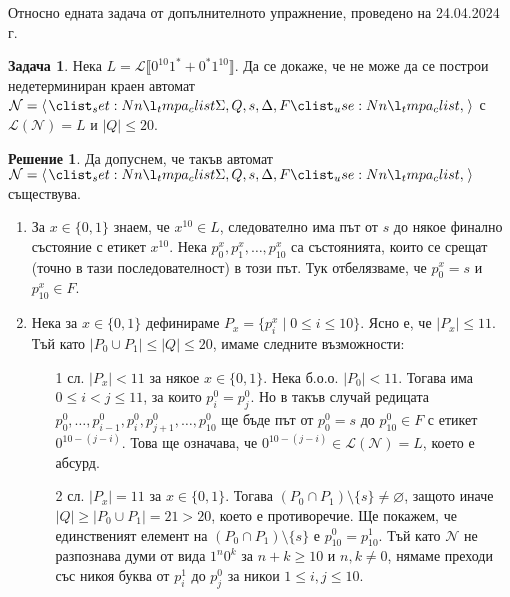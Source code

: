 \documentclass{article}
\newcommand{\N}{\mathcal{N}}
\newcommand{\calL}{\mathcal{L}}
\theoremstyle{definition}
\newtheorem*{problem}{Задача}
\newtheorem*{solution}{Решение}
\begin{document}
\begin{center}
    \Large{Относно едната задача от допълнителното упражнение, проведено на 24.04.2024 г.}
\end{center}

\vspace*{4mm}

\begin{problem}
Нека $L = \calL \llbracket 0^{10} 1^* + 0^* 1^{10} \rrbracket$.
Да се докаже, че не може да се построи недетерминиран краен автомат $\N = \opair{\Sigma, Q, s, \Delta, F}$ с $\calL(\N) = L$ и $|Q| \leq 20$.
\end{problem}

\begin{solution}
    Да допуснем, че такъв автомат $\N = \opair{\Sigma, Q, s, \Delta, F}$ съществува.
    \begin{enumerate}
        \item За $x \in \{ 0, 1 \}$ знаем, че $x^{10} \in L$, следователно има път от $s$ до някое финално състояние с етикет $x^{10}$.
              Нека $p^x_0, p^x_1, \dots, p^{x}_{10}$ са състоянията, които се срещат (точно в тази последователност) в този път.
              Тук отбелязваме, че $p^x_0 = s$ и $p^x_{10} \in F$.
        \item Нека за $x \in \{ 0, 1 \}$ дефинираме $P_x = \{ p^x_i \mid 0 \leq i \leq 10 \}$.
              Ясно е, че $|P_x| \leq 11$.
              Тъй като $|P_0 \cup P_1| \leq |Q| \leq 20$, имаме следните възможности:
              \begin{itemize}
                  \item[1 сл.] $|P_x| < 11$ за някое $x \in \{ 0, 1 \}$.
                        Нека б.о.о. $|P_0| < 11$.
                        Тогава има $0 \leq i < j \leq 11$, за които $p^0_i = p^0_j$.
                        Но в такъв случай редицата $p^0_0, \dots, p^0_{i - 1}, p^0_i, p^0_{j + 1}, \dots, p^0_{10}$ ще бъде път от $p^0_0 = s$ до $p^0_{10} \in F$ с етикет $0^{10 - (j - i)}$.
                        Това ще означава, че $0^{10 - (j - i)} \in \calL(\N) = L$, което е абсурд.
                  \item[2 сл.] $|P_x| = 11$ за $x \in \{ 0, 1 \}$.
                        Тогава $(P_0 \cap P_1) \setminus \{ s \} \neq \varnothing$, защото иначе $|Q| \geq |P_0 \cup P_1| = 21 > 20$, което е противоречие.
                        Ще покажем, че единственият елемент на $(P_0 \cap P_1) \setminus \{ s \}$ е $p^0_{10} = p^1_{10}$.
                        Тъй като $\N$ не разпознава думи от вида $1^{n}0^{k}$ за $n + k \geq 10$ и $n, k \neq 0$, нямаме преходи със никоя буква от $p^1_i$ до $p^0_j$ за никои $1 \leq i, j \leq 10$.

\end{itemize}
\end{enumerate}
\end{solution}
\end{document}

